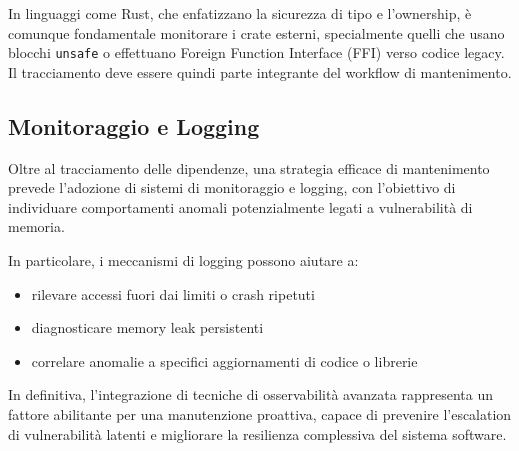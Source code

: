 In linguaggi come Rust, che enfatizzano la sicurezza di tipo e l'ownership, è comunque
fondamentale monitorare i crate esterni, specialmente quelli che usano blocchi
\texttt{unsafe} o effettuano Foreign Function Interface (FFI) verso codice legacy.
Il tracciamento deve essere quindi parte integrante del workflow di mantenimento.

\subsection{Monitoraggio e Logging}
\label{sec:monitoraggio-logging}

Oltre al tracciamento delle dipendenze, una strategia efficace di mantenimento
prevede l'adozione di sistemi di monitoraggio e logging, con l'obiettivo di individuare
comportamenti anomali potenzialmente legati a vulnerabilità di memoria.

In particolare, i meccanismi di logging possono aiutare a:
\begin{itemize}
  \item rilevare accessi fuori dai limiti o crash ripetuti

  \item diagnosticare memory leak persistenti

  \item correlare anomalie a specifici aggiornamenti di codice o librerie
\end{itemize}

In definitiva, l'integrazione di tecniche di osservabilità avanzata rappresenta un
fattore abilitante per una manutenzione proattiva, capace di prevenire l'escalation
di vulnerabilità latenti e migliorare la resilienza complessiva del sistema
software.